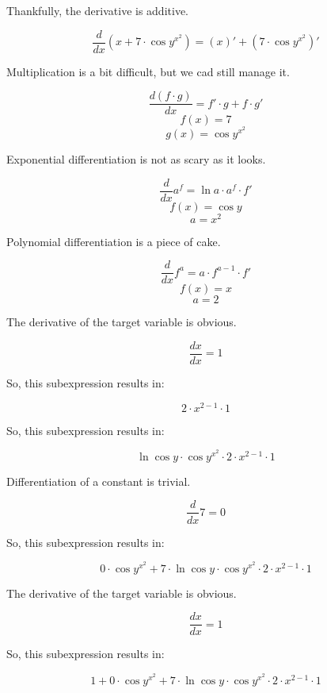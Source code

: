 \documentclass[12pt]{article}
\begin{document}
Thankfully, the derivative is additive.

$$ \frac{d}{dx} \left( x  +  7  \cdot \cos  y ^{ x ^{ 2 }}\right) = \left( x \right)' + \left( 7  \cdot \cos  y ^{ x ^{ 2 }}\right)' $$

Multiplication is a bit difficult, but we cad still manage it.

$$ \frac{d (f \cdot g)}{dx} = f' \cdot g + f \cdot g' $$
$$ f(x) =  7  $$
 $$ g(x) = \cos  y ^{ x ^{ 2 }} $$

Exponential differentiation is not as scary as it looks.

$$ \frac{d}{dx} a^f = \ln{a} \cdot a^f \cdot f' $$
$$ f(x) = \cos  y  $$
 $$ a =  x ^{ 2 } $$

Polynomial differentiation is a piece of cake.

$$ \frac{d}{dx} f^{a} = a \cdot f^{a - 1} \cdot f' $$
$$ f(x) =  x  $$
 $$ a =  2  $$

The derivative of the target variable is obvious.

$$ \frac{dx}{dx} = 1 $$

So, this subexpression results in:

$$  2  \cdot  x ^{ 2  -  1 } \cdot  1  $$

So, this subexpression results in:

$$ \ln \cos  y  \cdot \cos  y ^{ x ^{ 2 }} \cdot  2  \cdot  x ^{ 2  -  1 } \cdot  1  $$

Differentiation of a constant is trivial.

$$ \frac{d}{dx} 7 = 0 $$

So, this subexpression results in:

$$  0  \cdot \cos  y ^{ x ^{ 2 }} +  7  \cdot \ln \cos  y  \cdot \cos  y ^{ x ^{ 2 }} \cdot  2  \cdot  x ^{ 2  -  1 } \cdot  1  $$

The derivative of the target variable is obvious.

$$ \frac{dx}{dx} = 1 $$

So, this subexpression results in:

$$  1  +  0  \cdot \cos  y ^{ x ^{ 2 }} +  7  \cdot \ln \cos  y  \cdot \cos  y ^{ x ^{ 2 }} \cdot  2  \cdot  x ^{ 2  -  1 } \cdot  1  $$
\end{document}
